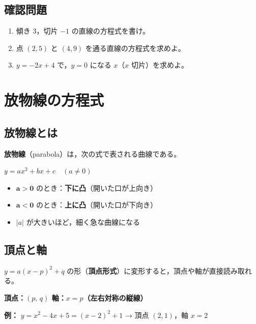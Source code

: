\documentclass[paper=a4,fleqn]{jlreq}
\newcommand{\formula}[1]{%
  \vspace{4pt}%
  \begin{center}{\large\bfseries\boldmath\(\displaystyle #1\)}\end{center}%
  \vspace{4pt}%
}
\begin{document}
\subsection{確認問題}
\begin{enumerate}
  \item 傾き \(3\)，切片 \(-1\) の直線の方程式を書け。
  \item 点 \((2, 5)\) と \((4, 9)\) を通る直線の方程式を求めよ。
  \item \(y = -2x + 4\) で，\(y = 0\) になる \(x\)（\(x\) 切片）を求めよ。
\end{enumerate}

\newpage
\section{放物線の方程式}

\subsection{放物線とは}

\textbf{放物線}（parabola）は，次の式で表される曲線である。

\formula{y = ax^2 + bx + c \quad (a \neq 0)}

\begin{itemize}
  \item \(\bm{a > 0}\) のとき：\textbf{下に凸}（開いた口が上向き）
  \item \(\bm{a < 0}\) のとき：\textbf{上に凸}（開いた口が下向き）
  \item \(|a|\) が大きいほど，細く急な曲線になる
\end{itemize}

\subsection{頂点と軸}

\(y = a(x - p)^2 + q\) の形（\textbf{頂点形式}）に変形すると，頂点や軸が直接読み取れる。

\begin{center}
{\large\bfseries\boldmath
  \textbf{頂点}：\((p,\, q)\) \qquad \textbf{軸}：\(x = p\)（左右対称の縦線）
}
\end{center}

\textbf{例：} \(y = x^2 - 4x + 5 = (x-2)^2 + 1\) → 頂点 \((2, 1)\)，軸 \(x = 2\)
\end{document}
